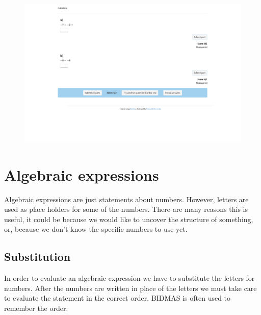 \documentclass[
  a4paper,
]{scrbook}
\begin{document}
\begin{figure}

{\centering 

\href{https://numbas.mathcentre.ac.uk/question/126315/negative-numbers-addition-and-subtraction/embed/?token=1a99ce84-edc0-4467-a780-e6e9bcc6fda8}{\includegraphics{./01-negative_numbers_files/figure-pdf/unnamed-chunk-5-1.png}}

}

\end{figure}


\hypertarget{algebraic-expressions}{%
\chapter{Algebraic expressions}\label{algebraic-expressions}}

Algebraic expressions are just statements about numbers. However,
letters are used as place holders for some of the numbers. There are
many reasons this is useful, it could be because we would like to
uncover the structure of something, or, because we don't know the
specific numbers to use yet.

\hypertarget{substitution}{%
\section{Substitution}\label{substitution}}

In order to evaluate an algebraic expression we have to substitute the
letters for numbers. After the numbers are written in place of the
letters we must take care to evaluate the statement in the correct
order. BIDMAS is often used to remember the order:
\end{document}
